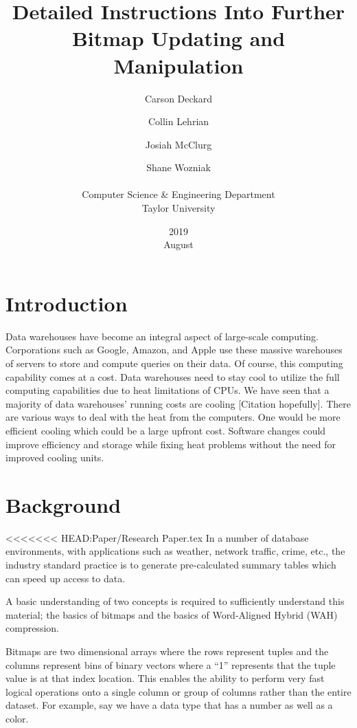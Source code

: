 \documentclass{article}
\title{Detailed Instructions Into Further Bitmap Updating and Manipulation}
\date{2019 \\ August }
\author{Carson Deckard \and Collin Lehrian \and Josiah McClurg \and Shane Wozniak \\ \\ Computer Science \&  Engineering Department \\ Taylor University}
\begin{document}
\maketitle

%
%
\section{Introduction}
\justify

Data warehouses have become an integral aspect of large-scale computing. Corporations such as Google, Amazon, and Apple use these massive warehouses of servers to store and compute queries on their data. Of course, this computing capability comes at a cost. Data warehouses need to stay cool to utilize the full computing capabilities due to heat limitations of CPUs. We have seen that a majority of data warehouses' running costs are cooling [Citation hopefully].
There are various ways to deal with the heat from the computers. One would be more efficient cooling which could be a large upfront cost. Software changes could improve efficiency and storage while fixing heat problems without the need for improved cooling units.     
%
%
\section{Background}
\justify

<<<<<<< HEAD:Paper/Research Paper.tex
In a number of database environments, with applications such as weather, network traffic, crime, etc., %
the industry standard practice is to generate pre-calculated summary tables which can speed up access to data.\par

A basic understanding of two concepts is required to sufficiently understand this material; the basics of bitmaps and the basics of Word-Aligned Hybrid (WAH) compression. \par

Bitmaps are two dimensional arrays where the rows represent tuples and the columns represent bins of binary vectors where a “1” represents that the tuple value is at that index location. This enables the ability to perform very fast logical operations onto a single column or group of columns rather than the entire dataset. For example, say we have a data type that has a number as well as a color. \par
\end{document}
